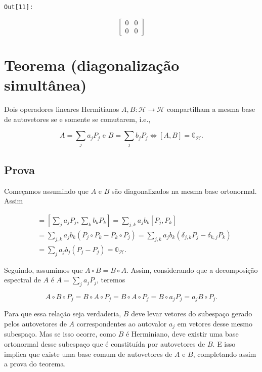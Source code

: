 \documentclass[11pt]{article}
\begin{document}
\texttt{\color{outcolor}Out[{\color{outcolor}11}]:}
    
    $$\left[\begin{matrix}0 & 0\\0 & 0\end{matrix}\right]$$

    

    \section{Teorema (diagonalização
simultânea)}\label{teorema-diagonalizauxe7uxe3o-simultuxe2nea}

Dois operadores lineares Hermitianos
\(A,B:\mathcal{H}\rightarrow\mathcal{H}\) compartilham a mesma base de
autovetores se e somente se comutarem, i.e.,

\begin{equation}
A=\sum_{j}a_{j}P_{j}\text{ e }B=\sum_{j}b_{j}P_{j}\Leftrightarrow [A,B]=\mathbb{0}_{\mathcal{H}}.
\end{equation}

\subsection{Prova}\label{prova}

Começamos assumindo que \(A\) e \(B\) são diagonalizados na mesma base
ortonormal. Assim

\begin{align}
[A,B] & = [\sum_{j}a_{j}P_{j},\sum_{k}b_{k}P_{k}] = \sum_{j,k}a_{j}b_{k}[P_{j},P_{k}] \\
& = \sum_{j,k}a_{j}b_{k}(P_{j}\circ P_{k} -P_{k}\circ P_{j}) = \sum_{j,k}a_{j}b_{k}(\delta_{j,k}P_{j} - \delta_{k,j}P_{k}) \\
& = \sum_{j}a_{j}b_{j}(P_{j} - P_{j}) = \mathbb{0}_{\mathcal{H}}.
\end{align}

Seguindo, assumimos que \(A\circ B=B\circ A\). Assim, considerando que a
decomposição espectral de \(A\) é \(A=\sum_{j}a_{j}P_{j}\), teremos

\begin{equation}
A\circ B\circ P_{j} =  B\circ A\circ P_{j} = B\circ A\circ P_{j} = B\circ a_{j}P_{j} = a_{j}B\circ P_{j}.
\end{equation}

Para que essa relação seja verdaderia, \(B\) deve levar vetores do
subespaço gerado pelos autovetores de \(A\) correspondentes ao autovalor
\(a_{j}\) em vetores desse mesmo subespaço. Mas se isso ocorre, como
\(B\) é Herminiano, deve existir uma base ortonormal desse subespaço que
é constituída por autovetores de \(B\). E isso implica que existe uma
base comum de autovetores de \(A\) e \(B\), completando assim a prova do
teorema.
\end{document}

